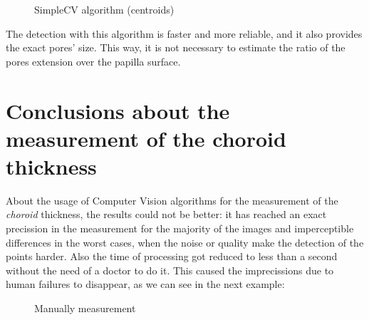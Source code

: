     \begin{figure}[H]
      \caption{SimpleCV algorithm (centroids)}
      \centering \setlength\fboxsep{0pt} \setlength\fboxrule{0.5pt}
    \end{figure}

The detection with this algorithm is faster and more reliable, and it
also provides the exact pores' size. This way, it is not necessary to
estimate the ratio of the pores extension over the papilla surface.


\section{Conclusions about the measurement of the choroid thickness}
About the usage of Computer Vision algorithms for the measurement of
the \emph{choroid} thickness, the results could not be better:
it has reached an exact precission in the measurement for the majority
of the images and imperceptible differences in the worst cases, when
the noise or quality make the detection of the points harder.
Also the time of processing got reduced to less than a second without
the need of a doctor to do it. This caused the imprecissions due to human 
failures to disappear, as we can see in the next example:

    \begin{figure}[H]
      \caption{Manually measurement}
      \centering \setlength\fboxsep{0pt} \setlength\fboxrule{0.5pt}
    \end{figure}

